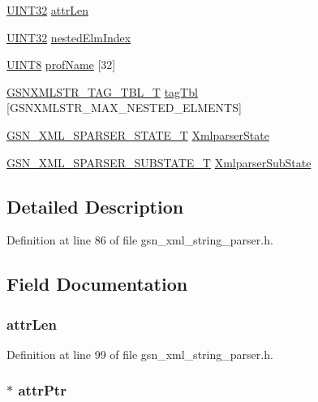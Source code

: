 \begin{DoxyCompactItemize}
\item 
\hyperlink{a00660_gae1e6edbbc26d6fbc71a90190d0266018}{UINT32} \hyperlink{a00444_a34cd5ff1ce9fc2d58e104f5b9e2dc9dc}{attrLen}
\item 
\hyperlink{a00660_gae1e6edbbc26d6fbc71a90190d0266018}{UINT32} \hyperlink{a00444_a34df7c03795a09bbfd62858b0f9c0b8d}{nestedElmIndex}
\item 
\hyperlink{a00660_gab27e9918b538ce9d8ca692479b375b6a}{UINT8} \hyperlink{a00444_a81eaaed6882a81ad762f0749cf27a0e8}{profName} \mbox{[}32\mbox{]}
\item 
\hyperlink{a00445}{GSNXMLSTR\_\-TAG\_\-TBL\_\-T} \hyperlink{a00444_a949468a32ac941964649a382ea7e2d4c}{tagTbl} \mbox{[}GSNXMLSTR\_\-MAX\_\-NESTED\_\-ELMENTS\mbox{]}
\item 
\hyperlink{a00617_a045b855de28d8d53ac3eea33744c4373}{GSN\_\-XML\_\-SPARSER\_\-STATE\_\-T} \hyperlink{a00444_aa9dbf5ff180d761f0b443a5aa1033143}{XmlparserState}
\item 
\hyperlink{a00617_ac9440bea1b7765eea3dee99fd963f32b}{GSN\_\-XML\_\-SPARSER\_\-SUBSTATE\_\-T} \hyperlink{a00444_a48f1851598822aa260307926fedfadad}{XmlparserSubState}
\end{DoxyCompactItemize}


\subsection{Detailed Description}


Definition at line 86 of file gsn\_\-xml\_\-string\_\-parser.h.



\subsection{Field Documentation}
\hypertarget{a00444_a34cd5ff1ce9fc2d58e104f5b9e2dc9dc}{
\subsubsection[{attrLen}]{ {\bf attrLen}}}
\label{a00444_a34cd5ff1ce9fc2d58e104f5b9e2dc9dc}


Definition at line 99 of file gsn\_\-xml\_\-string\_\-parser.h.

\hypertarget{a00444_aa29cdb4e4e5fa93e7e675604f5e229e2}{
\subsubsection[{attrPtr}]{$\ast$ {\bf attrPtr}}}
\label{a00444_aa29cdb4e4e5fa93e7e675604f5e229e2}


